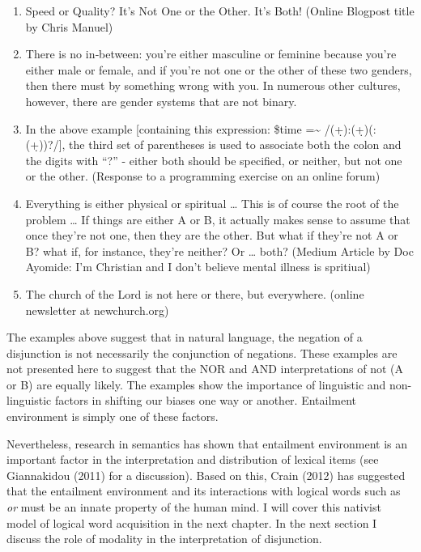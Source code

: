 \documentclass[oneside]{report}
\theoremstyle{definition}
\theoremstyle{definition}
\theoremstyle{definition}
\theoremstyle{remark}
\begin{document}
\begin{enumerate}
\def\labelenumi{(\arabic{enumi})}
\setcounter{enumi}{5}
\item
  Speed or Quality? It's Not One or the Other. It's Both! (Online
  Blogpost title by Chris Manuel)
\item
  There is no in‑between: you're either masculine or feminine because
  you're either male or female, and if you're not one or the other of
  these two genders, then there must by something wrong with you. In
  numerous other cultures, however, there are gender systems that are
  not binary.
\item
  In the above example {[}containing this expression: \$time
  =\textasciitilde{} /(\d+):(\d+)(:(\d+))?/{]}, the third set of
  parentheses is used to associate both the colon and the digits with
  ``?'' - either both should be specified, or neither, but not one or
  the other. (Response to a programming exercise on an online forum)
\item
  Everything is either physical or spiritual \ldots{} This is of course
  the root of the problem \ldots{} If things are either A or B, it
  actually makes sense to assume that once they're not one, then they
  are the other. But what if they're not A or B? what if, for instance,
  they're neither? Or \ldots{} both? (Medium Article by Doc Ayomide: I'm
  Christian and I don't believe mental illness is spritiual)
\item
  The church of the Lord is not here or there, but everywhere. (online
  newsletter at newchurch.org)
\end{enumerate}
The examples above suggest that in natural language, the negation of a
disjunction is not necessarily the conjunction of negations. These
examples are not presented here to suggest that the NOR and AND
interpretations of not (A or B) are equally likely. The examples show
the importance of linguistic and non-linguistic factors in shifting our
biases one way or another. Entailment environment is simply one of these
factors.

Nevertheless, research in semantics has shown that entailment
environment is an important factor in the interpretation and
distribution of lexical items (see Giannakidou (2011) for a discussion).
Based on this, Crain (2012) has suggested that the entailment
environment and its interactions with logical words such as \emph{or}
must be an innate property of the human mind. I will cover this nativist
model of logical word acquisition in the next chapter. In the next
section I discuss the role of modality in the interpretation of
disjunction.
\end{document}
